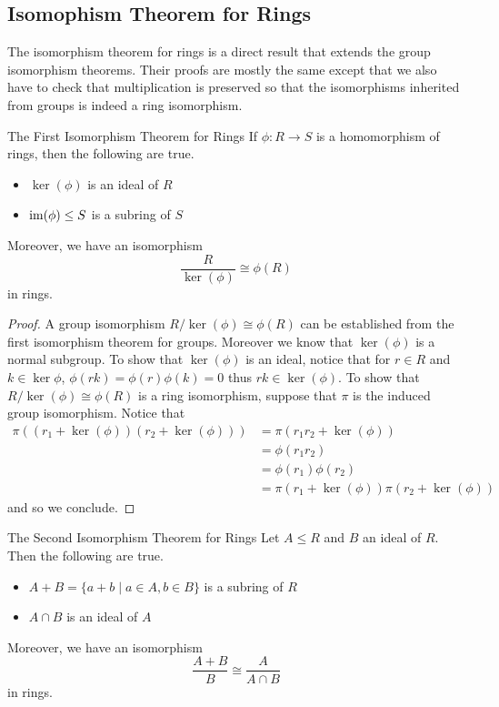 \documentclass[a4paper]{article}
\begin{document}
\subsection{Isomophism Theorem for Rings}
The isomorphism theorem for rings is a direct result that extends the group isomorphism theorems. Their proofs are mostly the same except that we also have to check that multiplication is preserved so that the isomorphisms inherited from groups is indeed a ring isomorphism. 

\begin{thm}{The First Isomorphism Theorem for Rings}{} If $\phi:R\to S$ is a homomorphism of rings, then the following are true. 
\begin{itemize}
\item $\ker(\phi)$ is an ideal of $R$
\item $\operatorname{im}(\phi)\leq S$ is a subring of $S$
\end{itemize}
Moreover, we have an isomorphism $$\frac{R}{\ker(\phi)}\cong\phi(R)$$ in rings. 
\begin{proof}
A group isomorphism $R/\ker(\phi)\cong\phi(R)$ can be established from the first isomorphism theorem for groups. Moreover we know that $\ker(\phi)$ is a normal subgroup. To show that $\ker(\phi)$ is an ideal, notice that for $r\in R$ and $k\in\ker\phi$, $\phi(rk)=\phi(r)\phi(k)=0$ thus $rk\in\ker(\phi)$. To show that $R/\ker(\phi)\cong\phi(R)$ is a ring isomorphism, suppose that $\pi$ is the induced group isomorphism. Notice that 
\begin{align*}
\pi((r_1+\ker(\phi))(r_2+\ker(\phi)))&=\pi(r_1r_2+\ker(\phi))\\
&=\phi(r_1r_2)\\
&=\phi(r_1)\phi(r_2)\\
&=\pi(r_1+\ker(\phi))\pi(r_2+\ker(\phi))
\end{align*}
and so we conclude. 
\end{proof}
\end{thm}

\begin{thm}{The Second Isomorphism Theorem for Rings}{} Let $A\leq R$ and $B$ an ideal of $R$. Then the following are true. 
\begin{itemize}
\item $A+B=\{a+b\;|\;a\in A,b\in B\}$ is a subring of $R$
\item $A\cap B$ is an ideal of $A$
\end{itemize}
Moreover, we have an isomorphism $$\frac{A+B}{B}\cong\frac{A}{A\cap B}$$ in rings. 
\end{thm}
\end{document}

